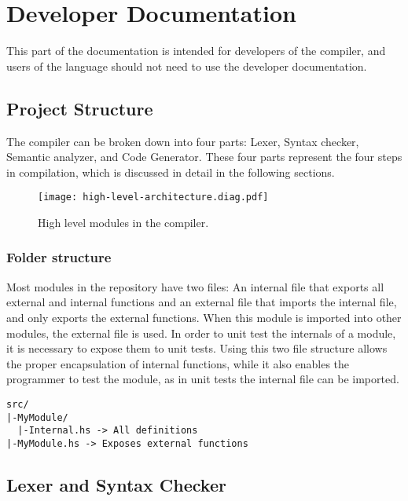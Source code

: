 \documentclass[12pt]{article}
\begin{document}
\lstset{numbers=left}

\pagebreak
\section{Developer Documentation}

This part of the documentation is intended for developers of the compiler, and
users of the language should not need to use the developer documentation.

\subsection{Project Structure}

The compiler can be broken down into four parts: Lexer, Syntax checker, Semantic
analyzer, and Code Generator. These four parts represent the four steps in
compilation, which is discussed in detail in the following sections.

\begin{figure}[h]
\texttt{[image: high-level-architecture.diag.pdf]}
\centering
\caption{High level modules in the compiler.}
\end{figure}

\subsubsection{Folder structure}

Most modules in the repository have two files: An internal file that exports all
external and internal functions and an external file that imports the internal
file, and only exports the external functions. When this module is imported into
other modules, the external file is used. In order to unit test the internals of
a module, it is necessary to expose them to unit tests. Using this two file
structure allows the proper encapsulation of internal functions, while it also
enables the programmer to test the module, as in unit tests the internal file
can be imported.

\lstset{numbers=none}
\begin{lstlisting}
src/
|-MyModule/
  |-Internal.hs -> All definitions
|-MyModule.hs -> Exposes external functions
\end{lstlisting}

\subsection{Lexer and Syntax Checker}
\end{document}
